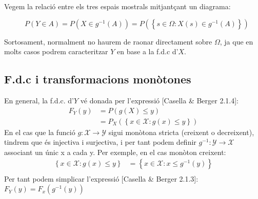 \documentclass[letterpaper,10pt,english]{sphinxmanual}
\let\sphinxpxdimen\pdfpxdimen\else\newdimen\sphinxpxdimen
\begin{document}
Vegem la relació entre els tres espais mostrals mitjantçant un diagrama:

\begin{figure}[htbp]
\centering
\capstart

\noindent\sphinxincludegraphics[height=280\sphinxpxdimen]{{transformation}.png}
\caption{\(P\left(Y \in A\right) = P\left(X \in g^{-1}\left(A\right)\right) = P\left(\left\{ s \in \Omega: X(s) \in g^{-1}\left(A\right) \right\}\right)\)}\label{\detokenize{0_Intro/0_1_Repas_probabilitat:id5}}\end{figure}

Sortosament, normalment no haurem de raonar directament sobre \(\Omega\), ja que en molts casos
podrem caracteritzar \(Y\) en base a la f.d.c d’\(X\).


\subsection{F.d.c i transformacions monòtones}
\label{\detokenize{0_Intro/0_1_Repas_probabilitat:f-d-c-i-transformacions-monotones}}
En general, la f.d.c. d’\(Y\) vé donada per l’expressió {[}Casella \& Berger 2.1.4{]}:
\begin{equation*}
\begin{split}F_Y\left(y\right) &= P\left( g\left(X\right) \leq y \right) \\
                  & = P_X\left(\left\{x \in \mathcal{X}: g\left(x\right) \leq y \right\}\right)\end{split}
\end{equation*}
En el cas que la funció \(g: \mathcal{X}\to\mathcal{Y}\) sigui monòtona stricta (creixent o decreixent),
tindrem que és injectiva i surjectiva, i per tant podem definir \(g^{-1}: \mathcal{Y}\to\mathcal{X}\)
associant un únic x a cada y. Per exemple, en el cas monòton creixent:
\begin{equation*}
\begin{split}\left\{x \in \mathcal{X}: g\left(x\right) \leq y \right\} & =  \left\{x \in \mathcal{X}: x \leq g^{-1}\left(y\right) \right\} \\\end{split}
\end{equation*}
Per tant podem simplicar l’expressió {[}Casella \& Berger 2.1.3{]}: \(F_Y\left(y\right) =F_x\left(g^{-1}\left(y\right)\right)\)
\end{document}
